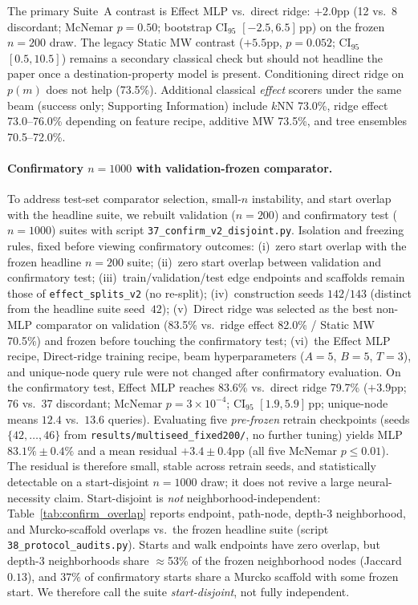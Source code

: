 \documentclass[journal=jcisd8,manuscript=article,email=false]{achemso}
\begin{document}
The primary Suite~A contrast is Effect MLP vs.\ direct ridge: $+2.0$pp (12 vs.\ 8 discordant; McNemar $p{=}0.50$; bootstrap CI$_{95}$ $[-2.5,6.5]$\,pp) on the frozen $n{=}200$ draw. The legacy Static MW contrast ($+5.5$pp, $p{=}0.052$; CI$_{95}$ $[0.5,10.5]$) remains a secondary classical check but should not headline the paper once a destination-property model is present. Conditioning direct ridge on $p(m)$ does not help (73.5\%). Additional classical \emph{effect} scorers under the same beam (success only; Supporting Information) include $k$NN 73.0\%, ridge effect 73.0--76.0\% depending on feature recipe, additive MW 73.5\%, and tree ensembles 70.5--72.0\%.

\paragraph{Confirmatory $n{=}1000$ with validation-frozen comparator.}
To address test-set comparator selection, small-$n$ instability, and start overlap with the headline suite, we rebuilt validation ($n{=}200$) and confirmatory test ($n{=}1000$) suites with script \texttt{37\_confirm\_v2\_disjoint.py}. Isolation and freezing rules, fixed before viewing confirmatory outcomes: (i)~zero start overlap with the frozen headline $n{=}200$ suite; (ii)~zero start overlap between validation and confirmatory test; (iii)~train/validation/test edge endpoints and scaffolds remain those of \texttt{effect\_splits\_v2} (no re-split); (iv)~construction seeds $142$/$143$ (distinct from the headline suite seed~$42$); (v)~Direct ridge was selected as the best non-MLP comparator on validation (83.5\% vs.\ ridge effect 82.0\% / Static MW 70.5\%) and frozen before touching the confirmatory test; (vi)~the Effect MLP recipe, Direct-ridge training recipe, beam hyperparameters ($A{=}5$, $B{=}5$, $T{=}3$), and unique-node query rule were not changed after confirmatory evaluation. On the confirmatory test, Effect MLP reaches 83.6\% vs.\ direct ridge 79.7\% ($+3.9$pp; 76 vs.\ 37 discordant; McNemar $p{=}3\times10^{-4}$; CI$_{95}$ $[1.9,5.9]$\,pp; unique-node means $12.4$ vs.\ $13.6$ queries). Evaluating five \emph{pre-frozen} retrain checkpoints (seeds $\{42,\ldots,46\}$ from \texttt{results/multiseed\_fixed200/}, no further tuning) yields MLP $83.1\%\pm0.4\%$ and a mean residual $+3.4\pm0.4$pp (all five McNemar $p{\le}0.01$). The residual is therefore small, stable across retrain seeds, and statistically detectable on a start-disjoint $n{=}1000$ draw; it does not revive a large neural-necessity claim.
Start-disjoint is \emph{not} neighborhood-independent: Table~\ref{tab:confirm_overlap} reports endpoint, path-node, depth-3 neighborhood, and Murcko-scaffold overlaps vs.\ the frozen headline suite (script \texttt{38\_protocol\_audits.py}). Starts and walk endpoints have zero overlap, but depth-3 neighborhoods share $\approx$53\% of the frozen neighborhood nodes (Jaccard $0.13$), and $37\%$ of confirmatory starts share a Murcko scaffold with some frozen start. We therefore call the suite \emph{start-disjoint}, not fully independent.
\label{tab:chem}%
\end{document}
